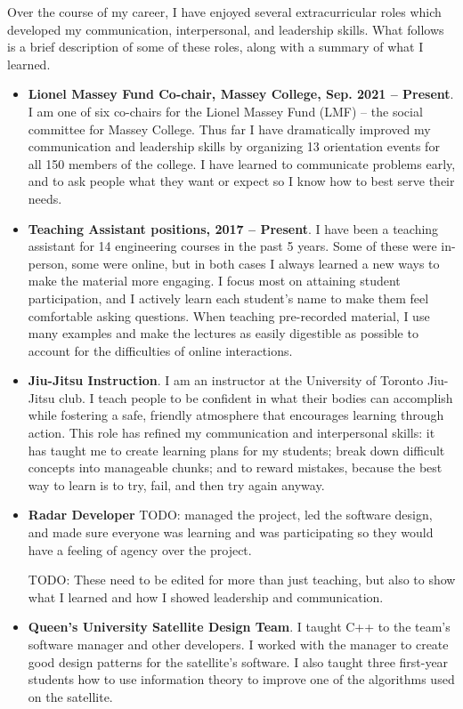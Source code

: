 \documentclass[a4paper,12pt]{article}
\begin{document}
Over the course of my career, I have enjoyed several extracurricular roles which
developed my communication, interpersonal, and leadership skills.
What follows is a brief description of some of these roles, along with a summary
of what I learned.
\begin{itemize}
\item \textbf{Lionel Massey Fund Co-chair, Massey College, Sep. 2021 -- Present}.
    I am one of six co-chairs for the Lionel Massey Fund (LMF) -- the social
    committee for Massey College. Thus far I have dramatically improved my
    communication and leadership skills by organizing 13 orientation events for
    all 150 members of the college. I have learned to communicate problems
    early, and to ask people what they want or expect so I know how to best
    serve their needs.

\item \textbf{Teaching Assistant positions, 2017 -- Present}.
    I have been a teaching assistant for 14 engineering courses in the past 5 years.
    Some of these were in-person, some were online, but in both cases I always
    learned a new ways to make the material more engaging.
    I focus most on attaining student participation, and I actively learn each
    student's name to make them feel comfortable asking questions. When teaching
    pre-recorded material, I use many examples and make the lectures as easily
    digestible as possible to account for the difficulties of online
    interactions.

\item \textbf{Jiu-Jitsu Instruction}. 
    I am an instructor at the University of Toronto Jiu-Jitsu club. I teach
    people to be confident in what their bodies can accomplish while fostering a
    safe, friendly atmosphere that encourages learning through action.
    This role has refined my communication and interpersonal skills:
    it has taught me to create learning plans for my students;
    break down difficult concepts into manageable chunks; 
    and to reward mistakes, because the best way to learn is to try, fail, and
    then try again anyway.

\item \textbf{Radar Developer}
    TODO: managed the project, led the software design, and made sure everyone
    was learning and was participating so they would have a feeling of agency
    over the project.

    TODO: These need to be edited for more than just teaching, but also to show
    what I learned and how I showed leadership and communication.
\item \textbf{Queen’s University Satellite Design Team}. 
    I taught C++ to the team’s software manager and other developers. I worked
    with the manager to create good design patterns for the satellite’s
    software. I also taught three first-year students how to use information
    theory to improve one of the algorithms used on the satellite.


\end{itemize}
\end{document}
